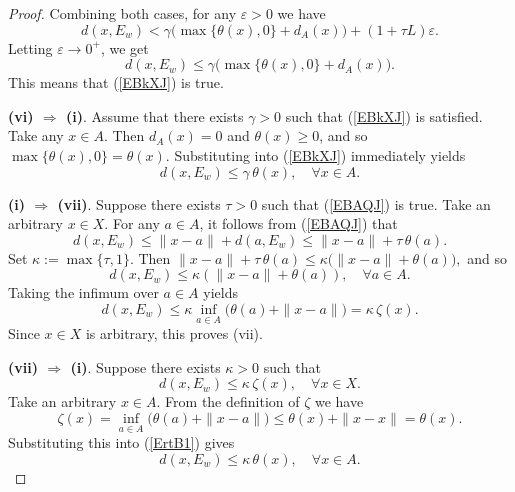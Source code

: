 \documentclass[11pt]{article}
\begin{document}
\begin{proof}
Combining both cases, for any $\varepsilon>0$ we have
\[
d(x,E_w) < \gamma\bigl(\max\{\theta(x),0\}+d_A(x)\bigr) + (1+\tau L)\varepsilon.
\]
Letting $\varepsilon\to0^+$, we get
\[
d(x,E_w) \le \gamma\bigl(\max\{\theta(x),0\}+d_A(x)\bigr).
\]
 This means that (\ref{EBkXJ}) is true.

  
 
 	\noindent\textbf{(vi) $\Rightarrow$ (i)}.
 Assume that  there exists $\gamma>0$ such that (\ref{EBkXJ}) is satisfied.
  Take any $x\in A$. Then $d_A(x)=0$  and   $\theta(x)\ge0$, and so $\max\{\theta(x),0\}=\theta(x)$. Substituting into (\ref{EBkXJ}) immediately yields
 \[
 d(x,E_w)\le \gamma\,\theta(x),\quad \forall x\in A.
 \]
  
 
 
  	\noindent\textbf{(i) $\Rightarrow$ (vii)}.
  Suppose there exists \(\tau > 0\) such that   (\ref{EBAQJ}) is true.
 Take an arbitrary \(x \in X\). For any \(a \in A\),   it follows from  (\ref{EBAQJ})  that
 \[
 d(x, E_w) \le \|x - a\| + d(a, E_w) \le \|x - a\| + \tau \, \theta(a).
 \]
 Set \(\kappa := \max\{\tau, 1\}\). Then  
$  \|x - a\| + \tau \, \theta(a) \le \kappa \bigl( \|x - a\| + \theta(a) \bigr),$  and so
   $$d(x, E_w) \le \kappa (\|x - a\| + \theta(a)),  \quad  \forall a \in A.  $$
 Taking the infimum over \(a \in A\) yields  
 \[
 d(x, E_w) \le \kappa \inf_{a \in A} \bigl( \theta(a) + \|x - a\| \bigr) = \kappa \, \zeta(x).
 \]
 Since \(x \in X\) is arbitrary, this proves (vii).
 
 
  	\noindent\textbf{(vii) $\Rightarrow$ (i)}.
 Suppose there exists \(\kappa > 0\) such that 
 \begin{equation}\label{ErtB1}
 	d(x, E_w) \le \kappa \, \zeta(x), \quad  \forall x \in X.
 \end{equation}
 Take an arbitrary \(x \in A\). From the definition of \(\zeta\) we have  
 \[
\zeta(x) = \inf_{a \in A} \bigl( \theta(a) + \|x - a\| \bigr) \le \theta(x) + \|x - x\| = \theta(x).
 \]
 Substituting this into    (\ref{ErtB1})   gives  
 \[
 d(x, E_w) \le \kappa \, \theta(x), \quad \forall x \in A.
 \]
  
	

	 	
	  

\end{proof}
\end{document}
